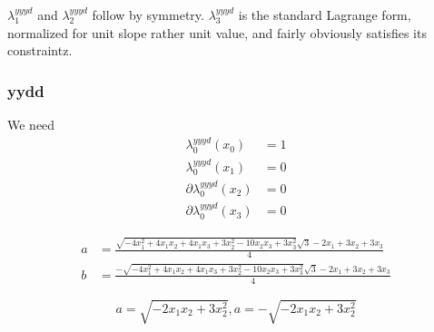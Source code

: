$\lambda^{yyyd}_1$ and $\lambda^{yyyd}_2$ follow by symmetry.
$\lambda^{yyyd}_3$ is the standard Lagrange form,
normalized for unit slope rather unit value, and fairly obviously
satisfies its constraintz.
 
\subsubsection{yydd}

We need 
\begin{align}
\lambda^{yyyd}_0(x_0) & = 1 \\ 
\lambda^{yyyd}_0(x_1) & = 0 \nonumber \\
\partial\lambda^{yyyd}_0(x_2) & = 0 \nonumber \\
\partial\lambda^{yyyd}_0(x_3) & = 0 \nonumber 
\end{align}

\begin{align}
a & = \frac
{
\sqrt {-4 x_1^{2}+4 x_1 x_2+
4 x_1 x_3+3 x_2^{2}-10 x_2 x_3+3 x_3^{2}} 
\sqrt {3}-2 x_1+3 x_2+3 x_3
}{
4
} 
\\
b & = \frac
{
-\sqrt {-4 x_1^{2}+4 x_1 x_2+
4 x_1 x_3+3 x_2^{2}-10 x_2 x_3+3 x_3^{2}} 
\sqrt {3}-2 x_1+3 x_2+3 x_3
}{
4
} 
\nonumber
\end{align}

\begin{equation}
a=\sqrt {-2 x_1 x_2+3 x_2^{2}} , a=-\sqrt {-2 x_1 x_2+3 x_2^{2}}
\end{equation}

 